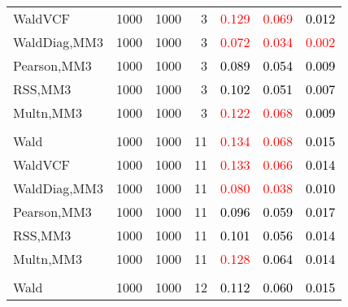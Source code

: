 \documentclass[
]{article}
\begin{document}
\begin{table}[H]
{\begin{tabular}[t]{lrrrrrr}
\hspace{1em}WaldVCF & 1000 & 1000 & 3 & \textcolor{red}{0.129} & \textcolor{red}{0.069} & \textcolor{black}{0.012}\\
\hspace{1em}WaldDiag,MM3 & 1000 & 1000 & 3 & \textcolor{red}{0.072} & \textcolor{red}{0.034} & \textcolor{red}{0.002}\\
\hspace{1em}Pearson,MM3 & 1000 & 1000 & 3 & \textcolor{black}{0.089} & \textcolor{black}{0.054} & \textcolor{black}{0.009}\\
\hspace{1em}RSS,MM3 & 1000 & 1000 & 3 & \textcolor{black}{0.102} & \textcolor{black}{0.051} & \textcolor{black}{0.007}\\
\hspace{1em}Multn,MM3 & 1000 & 1000 & 3 & \textcolor{red}{0.122} & \textcolor{red}{0.068} & \textcolor{black}{0.009}\\
\addlinespace[0.3em]
\multicolumn{7}{l}{\textbf{1F 15V}}\\
\hspace{1em}Wald & 1000 & 1000 & 11 & \textcolor{red}{0.134} & \textcolor{red}{0.068} & \textcolor{black}{0.015}\\
\hspace{1em}WaldVCF & 1000 & 1000 & 11 & \textcolor{red}{0.133} & \textcolor{red}{0.066} & \textcolor{black}{0.014}\\
\hspace{1em}WaldDiag,MM3 & 1000 & 1000 & 11 & \textcolor{red}{0.080} & \textcolor{red}{0.038} & \textcolor{black}{0.010}\\
\hspace{1em}Pearson,MM3 & 1000 & 1000 & 11 & \textcolor{black}{0.096} & \textcolor{black}{0.059} & \textcolor{black}{0.017}\\
\hspace{1em}RSS,MM3 & 1000 & 1000 & 11 & \textcolor{black}{0.101} & \textcolor{black}{0.056} & \textcolor{black}{0.014}\\
\hspace{1em}Multn,MM3 & 1000 & 1000 & 11 & \textcolor{red}{0.128} & \textcolor{black}{0.064} & \textcolor{black}{0.014}\\
\addlinespace[0.3em]
\multicolumn{7}{l}{\textbf{2F 10V}}\\
\hspace{1em}Wald & 1000 & 1000 & 12 & \textcolor{black}{0.112} & \textcolor{black}{0.060} & \textcolor{black}{0.015}\\

\end{tabular}}
\end{table}
\end{document}
